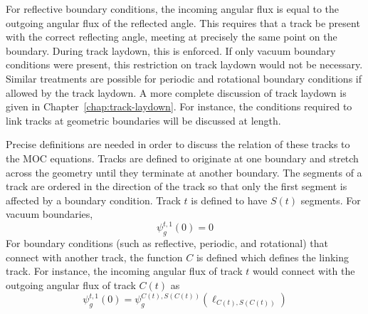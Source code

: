 For reflective boundary conditions, the incoming angular flux is equal to the outgoing angular flux of the reflected angle. This requires that a track be present with the correct reflecting angle, meeting at precisely the same point on the boundary. During track laydown, this is enforced. If only vacuum boundary conditions were present, this restriction on track laydown would not be necessary. Similar treatments are possible for periodic and rotational boundary conditions if allowed by the track laydown.  A more complete discussion of track laydown is given in Chapter~\ref{chap:track-laydown}. For instance, the conditions required to link tracks at geometric boundaries will be discussed at length.

Precise definitions are needed in order to discuss the relation of these tracks to the \ac{MOC} equations. Tracks are defined to originate at one boundary and stretch across the geometry until they terminate at another boundary. The segments of a track are ordered in the direction of the track so that only the first segment is affected by a boundary condition. Track $t$ is defined to have $S(t)$ segments. For vacuum boundaries,
\begin{dmath}
	\psi_g^{t,1}(0) = 0
\end{dmath}
For boundary conditions (such as reflective, periodic, and rotational) that connect with another track, the function $C$ is defined which defines the linking track. For instance, the incoming angular flux of track $t$ would connect with the outgoing angular flux of track $C(t)$ as
\begin{dmath}
	\psi_g^{t,1}(0) = \psi_g^{C(t),S(C(t))}(\ell_{C(t),S(C(t))})
	\label{eqn:linking-bc}
\end{dmath}

